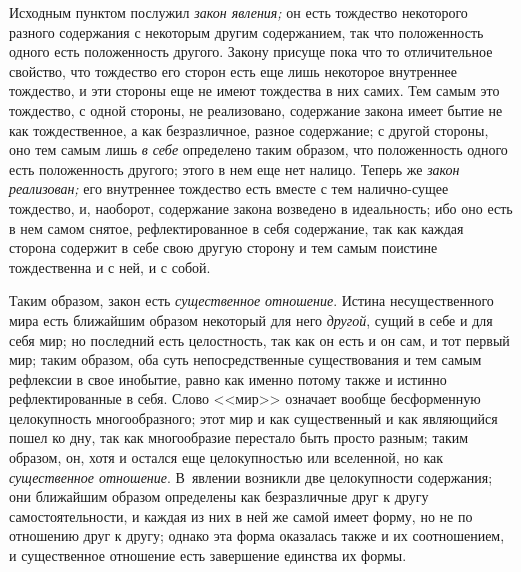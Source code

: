 Исходным пунктом послужил {\em закон явления;} он есть
тождество некоторого разного содержания с некоторым другим содержанием, так
что положенность одного есть положенность другого. Закону присуще пока что
то отличительное свойство, что тождество его сторон есть еще лишь некоторое
внутреннее тождество, и эти стороны еще не имеют тождества в них самих. Тем
самым это тождество, с одной стороны, не реализовано, содержание закона
имеет бытие не как тождественное, а как безразличное, разное содержание; с
другой стороны, оно тем самым лишь {\em в себе}
определено таким образом, что положенность одного есть положенность
другого; этого в нем еще нет налицо. Теперь же
{\em закон реализован;} его внутреннее тождество есть
вместе с тем налично-сущее тождество, и, наоборот, содержание закона
возведено в идеальность; ибо оно есть в нем самом снятое, рефлектированное
в себя содержание, так как каждая сторона содержит в себе свою другую
сторону и тем самым поистине тождественна и с ней, и с собой.

Таким образом, закон есть {\em существенное отношение}.
Истина несущественного мира есть ближайшим образом некоторый для него
{\em другой}, сущий в себе и для себя мир; но последний
есть целостность, так как он есть и он сам, и тот первый мир; таким
образом, оба суть непосредственные существования и тем самым рефлексии в
свое инобытие, равно как именно потому также и истинно рефлектированные в
себя. Слово <<мир>> означает вообще бесформенную целокупность многообразного;
этот мир и как существенный и как являющийся пошел ко дну, так как
многообразие перестало быть просто разным; таким образом, он, хотя и
остался еще целокупностью или вселенной, но как
{\em существенное отношение}. В~явлении возникли две
целокупности содержания; они ближайшим образом определены как безразличные
друг к другу самостоятельности, и каждая из них в ней же самой имеет форму,
но не по отношению друг к другу; однако эта форма оказалась также и их
соотношением, и существенное отношение есть завершение единства их формы.


